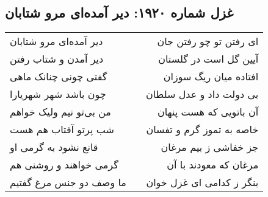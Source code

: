 \begin{center}
\section*{غزل شماره ۱۹۲۰: دیر آمده‌ای مرو شتابان}
\label{sec:1920}
\begin{longtable}{l p{0.5cm} r}
دیر آمده‌ای مرو شتابان
&&
ای رفتن تو چو رفتن جان
\\
دیر آمدن و شتاب رفتن
&&
آیین گل است در گلستان
\\
گفتی چونی چنانک ماهی
&&
افتاده میان ریگ سوزان
\\
چون باشد شهر شهریارا
&&
بی دولت داد و عدل سلطان
\\
من بی‌تو نیم ولیک خواهم
&&
آن باتویی که هست پنهان
\\
شب پرتو آفتاب هم هست
&&
خاصه به تموز گرم و تفسان
\\
قانع نشود به گرمی او
&&
جز خفاشی ز بیم مرغان
\\
گرمی خواهند و روشنی هم
&&
مرغان که معودند با آن
\\
ما وصف دو جنس مرغ گفتیم
&&
بنگر ز کدامی ای غزل خوان
\\
\end{longtable}
\end{center}
